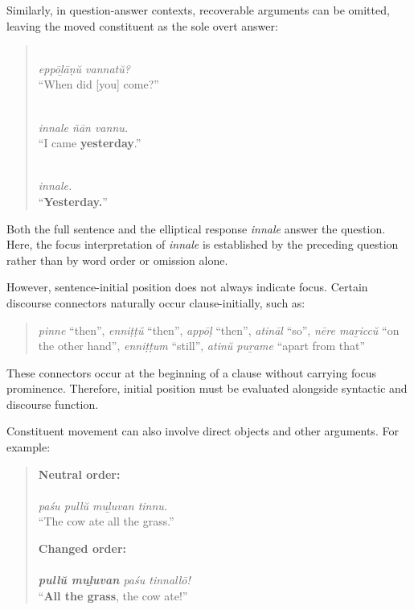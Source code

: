 Similarly, in question-answer contexts, recoverable arguments can be omitted, leaving the moved constituent as the sole overt answer:

\begin{quote}
\\
\textit{eppōḻāṇŭ vannatŭ?}\\
``When did [you] come?''

\\
\textit{innale ñān vannu.}\\
``I came \textbf{yesterday}.''

\\
\textit{innale.}\\
``\textbf{Yesterday.}''
\end{quote}

Both the full sentence and the elliptical response \textit{innale} answer the question. Here, the focus interpretation of \textit{innale} is established by the preceding question rather than by word order or omission alone.

However, sentence-initial position does not always indicate focus. Certain discourse connectors naturally occur clause-initially, such as:

\begin{quote}
\textit{pinne} ``then'', \textit{enniṭṭŭ} ``then'', \textit{appōḷ} ``then'',
\textit{atināl} ``so'', \textit{nēre maṟiccŭ} ``on the other hand'',
\textit{enniṭṭum} ``still'', \textit{atinŭ puṟame} ``apart from that''
\end{quote}

These connectors occur at the beginning of a clause without carrying focus prominence. Therefore, initial position must be evaluated alongside syntactic and discourse function.

Constituent movement can also involve direct objects and other arguments. For example:

\begin{quote}
\textbf{Neutral order:}\\
\\
\textit{paśu pullŭ muḻuvan tinnu.}\\
``The cow ate all the grass.''

\textbf{Changed order:}\\
\\
\textit{\textbf{pullŭ muḻuvan} paśu tinnallō!}\\
``\textbf{All the grass}, the cow ate!''
\end{quote}

